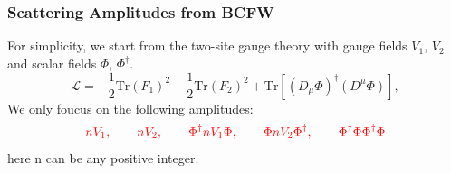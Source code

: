 \documentclass{beamer}
\begin{document}
\begin{frame}
    \frametitle{Scattering Amplitudes from BCFW}
    For simplicity, we start from the two-site gauge theory with gauge fields $V_1$, $V_2$ and scalar fields $\Phi$, $\Phi^\dagger$.
    \begin{equation*}
        \mathcal{L}=-\frac{1}{2}\mathrm{Tr}(F_1)^2-\frac{1}{2}\mathrm{Tr}(F_2)^2+\mathrm{Tr}[(D_\mu\Phi)^\dagger(D^\mu\Phi)],
    \end{equation*}
We only foucus on the following amplitudes:
\begin{equation*}
    \textcolor{red}{nV_1,\qquad nV_2,\qquad\Phi^\dagger nV_1 \Phi,\qquad \Phi nV_2 \Phi^\dagger,\qquad \Phi^\dagger \Phi\Phi^\dagger \Phi}
\end{equation*}
here n can be any positive integer.
\end{frame}
\end{document}
